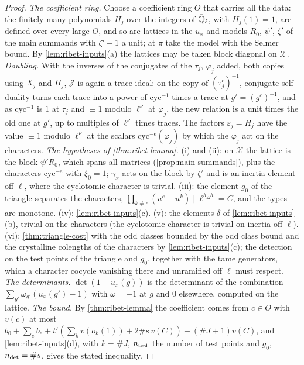 \begin{proof}
\emph{The coefficient ring.} Choose a coefficient ring $O$ that carries all the data: the finitely many polynomials $H_j$ over the integers of $\bar{\mathbb{Q}}_\ell$, with $H_j(1)=1$, are defined over every large $O$, and so are lattices in the $u_x$ and models
$R_0$, $\psi'$, $\zeta'$ of the main summands with $\zeta'-1$ a unit; at $\pi$ take the model with the Selmer bound. By \cref{lem:ribet-inputs}(a) the lattices may be taken block diagonal on $\mathcal X$. \emph{Doubling.} With the inverses of the
conjugates of the $\tau_j$, $\varphi_j$ added, both copies using $X_j$ and $H_j$, $\mathcal J$ is again a trace ideal: on the copy of $(\tau_j^c)^{-1}$, conjugate self-duality turns each trace into a power of $\mathrm{cyc}^{-1}$ times a trace at $g'=(g^c)^{-1}$, and as
$\mathrm{cyc}^{-1}$ is $1$ at $\tau_j$ and $\equiv1$ modulo $\ell^\nu$ at $\varphi_j$, the new relation is a unit times the old one at $g'$, up to multiples of $\ell^\nu$ times traces. The factors $\varepsilon_j=H_j$ have the value $\equiv1$ modulo $\ell^\nu$ at the scalars
$\mathrm{cyc}^{-e}(\varphi_j)$ by which the $\varphi_j$ act on the characters.
\emph{The hypotheses of \cref{thm:ribet-lemma}.} (i) and (ii): on $\mathcal X$ the lattice is the block $\psi'R_0$, which spans all matrices (\cref{prop:main-summands}), plus the characters $\mathrm{cyc}^{-e}$ with $\xi_0=1$; $\gamma_x$ acts on the block by $\zeta'$ and is an
inertia element off $\ell$, where the cyclotomic character is trivial. (iii): the element $g_0$ of the triangle separates the characters, $\prod_{k\ne e}(u^e-u^k)\mid\ell^{h_\Delta h}=C$, and the types are monotone. (iv): \cref{lem:ribet-inputs}(c). (v): the elements
$\delta$ of \cref{lem:ribet-inputs}(b), trivial on the characters (the cyclotomic character is trivial on inertia off $\ell$). (vi): \cref{thm:triangle-cost} with the odd classes bounded by the odd class bound and the crystalline colengths of the
characters by \cref{lem:ribet-inputs}(c); the detection on the test points of the triangle and $g_0$, together with the tame generators, which a character cocycle vanishing there and unramified off $\ell$ must respect.
\emph{The determinants.} $\det(1-u_x(g))$ is the determinant of the combination $\sum_{g'}\omega_{g'}(u_x(g')-1)$ with $\omega=-1$ at $g$ and $0$ elsewhere, computed on the lattice. \emph{The bound.} By \cref{thm:ribet-lemma} the coefficient comes from $c\in O$
with $v(c)$ at most $b_0+\sum_eb_e+t'(\sum_kv(o_k(1))+2\#s\,v(C))+(\#J+1)v(C)$, and \cref{lem:ribet-inputs}(d), with $k=\#J$, $n_{\rm test}$ the number of test points and $g_0$, $n_{\rm det}=\#s$, gives the stated inequality.
\end{proof}

